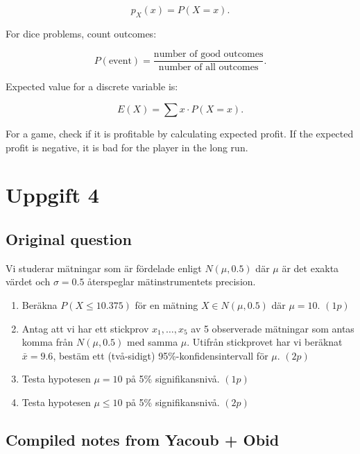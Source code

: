 \documentclass[10pt]{article}
\begin{document}
\[
p_X(x)=P(X=x).
\]

For dice problems, count outcomes:

\[
P(\text{event})
=
\frac{\text{number of good outcomes}}
{\text{number of all outcomes}}.
\]

Expected value for a discrete variable is:

\[
E(X)=\sum x\cdot P(X=x).
\]

For a game, check if it is profitable by calculating expected profit.
If the expected profit is negative, it is bad for the player in the long run.

\section*{Uppgift 4}

\subsection*{Original question}

Vi studerar mätningar som är fördelade enligt
\(N(\mu,0.5)\) där \(\mu\) är det exakta värdet
och \(\sigma = 0.5\) återspeglar mätinstrumentets
precision.

\begin{enumerate}[label=\alph*)]
\item Beräkna \(P(X \le 10.375)\) för en mätning
\(X \in N(\mu,0.5)\) där \(\mu = 10\). \((1p)\)

\item Antag att vi har ett stickprov
\(x_1,\ldots,x_5\) av 5 observerade mätningar som
antas komma från \(N(\mu,0.5)\) med samma \(\mu\).
Utifrån stickprovet har vi beräknat \(\bar{x}=9.6\),
bestäm ett (två-sidigt) 95\%-konfidensintervall
för \(\mu\). \((2p)\)

\item Testa hypotesen \(\mu = 10\) på
5\% signifikansnivå. \((1p)\)

\item Testa hypotesen \(\mu \le 10\) på
5\% signifikansnivå. \((2p)\)
\end{enumerate}

\subsection*{Compiled notes from Yacoub + Obid}
\end{document}
